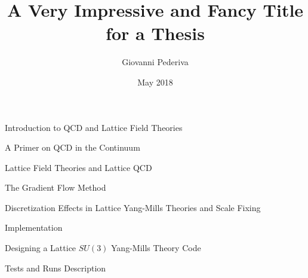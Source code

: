 \documentclass[twoside,english, a4paper, 11pt]{shared/uiofysmaster}
\author{Giovanni Pederiva}
\title{\bf{A Very Impressive and Fancy Title for a Thesis}}
\date{May 2018}
\begin{document}


\maketitle
\clearpage

\tableofcontents
\clearpage

\begin{abstract}
	
\end{abstract}
\begin{acknowledgements}
	
\end{acknowledgements}

\begin{part}{Introduction to QCD and Lattice Field Theories}
	\label{part:intro}
	\begin{chapter}{A Primer on QCD in the Continuum}
		\label{chap:qcd_intro}
  		
	\end{chapter}

	\begin{chapter}{Lattice Field Theories and Lattice QCD}
		\label{chap:lattice_intro}
	  	
	\end{chapter}

	\begin{chapter}{The Gradient Flow Method}
		\label{chap:grad_intro}
	  	
	\end{chapter}

	\begin{chapter}{Discretization Effects in Lattice Yang-Mills Theories and Scale Fixing}
		\label{chap:problem_intro}
	  	
	\end{chapter}
\end{part}


\begin{part}{Implementation}
	\begin{chapter}{Designing a Lattice $SU(3)$ Yang-Mills Theory Code}
  		\label{chap:code_design}
  		
	\end{chapter}

	\begin{chapter}{Tests and Runs Description}
		\label{chap:test_runs}
		
  \end{chapter}
\end{part}
\end{document}
